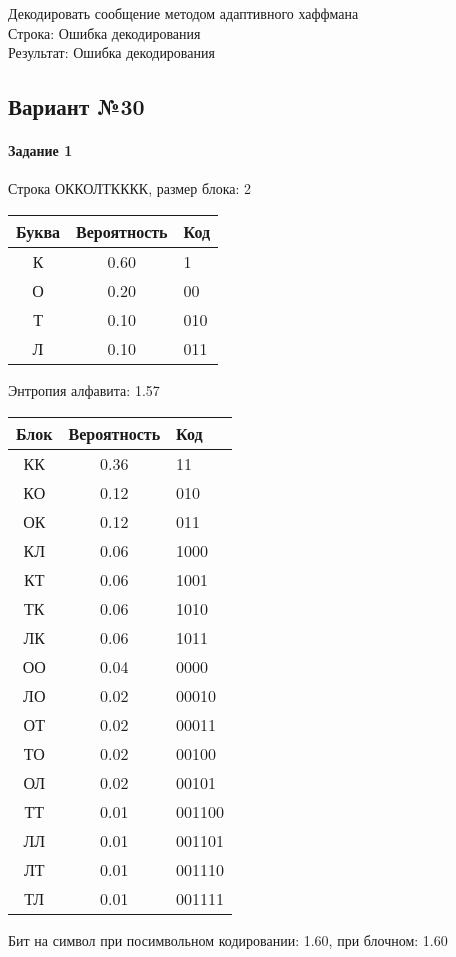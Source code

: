 \documentclass[a4paper, 12pt]{article}
\begin{document}
Декодировать сообщение методом адаптивного хаффмана \\
Строка: 
Ошибка декодирования\\
Результат: Ошибка декодирования
\pagebreak
\subsection{Вариант №30}
\paragraph{Задание 1}

Строка ОККОЛТКККК, размер блока: 2
\begin{center}
 \begin{tabular}{ |c|c|l| } 
  \hline
     Буква & Вероятность & Код\\ \hline
К & 0.60 & 1\\\hline
О & 0.20 & 00\\\hline
Т & 0.10 & 010\\\hline
Л & 0.10 & 011
\\ \hline \end{tabular}
\end{center}
Энтропия алфавита: 1.57
\begin{center}
 \begin{tabular}{ |c|c|l| } 
  \hline
     Блок & Вероятность & Код\\ \hline
КК & 0.36 & 11\\\hline
КО & 0.12 & 010\\\hline
ОК & 0.12 & 011\\\hline
КЛ & 0.06 & 1000\\\hline
КТ & 0.06 & 1001\\\hline
ТК & 0.06 & 1010\\\hline
ЛК & 0.06 & 1011\\\hline
ОО & 0.04 & 0000\\\hline
ЛО & 0.02 & 00010\\\hline
ОТ & 0.02 & 00011\\\hline
ТО & 0.02 & 00100\\\hline
ОЛ & 0.02 & 00101\\\hline
ТТ & 0.01 & 001100\\\hline
ЛЛ & 0.01 & 001101\\\hline
ЛТ & 0.01 & 001110\\\hline
ТЛ & 0.01 & 001111
\\ \hline \end{tabular}
\end{center}
Бит на символ при посимвольном кодировании: 1.60, при блочном: 1.60
\end{document}

